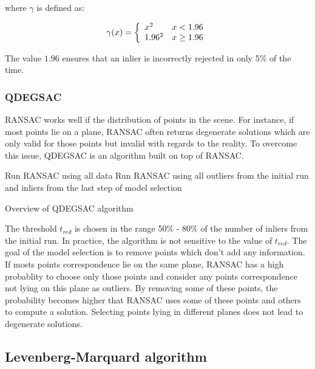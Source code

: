 \documentclass[12pt]{article}
\begin{document}
where $\gamma$ is defined as:

\[
    \gamma(x) = 
\left \{
  \begin{array}{l l}
        x^2 & x < 1.96 \\
        1.96^2 & x \geq 1.96 \\
  \end{array}
\right.
\] 

The value $1.96$ ensures that an inlier is incorrectly rejected in only 5\% of the time.

\subsubsection{QDEGSAC}

RANSAC works well if the distribution of points in the scene. For instance, if most points lie on a plane, RANSAC often returns degenerate solutions which are only valid for those points but invalid with regards to the reality. To overcome this issue, QDEGSAC\cite{Qdegsac06} is an algorithm built on top of RANSAC.

\begin{algorithm}[H]
  Run RANSAC using all data\;
  Run RANSAC using all outliers from the initial run and inliers from the last step of model selection\;
 \caption{Overview of QDEGSAC algorithm}
\end{algorithm}

The threshold $t_{red}$ is chosen in the range 50\% - 80\% of the number of inliers from the initial run. In practice, the algorithm is not sensitive to the value of $t_{red}$. The goal of the model selection is to remove points which don't add any information. If mosts points correspondence lie on the same plane, RANSAC has a high probablity to choose only those points and consider any points correspondence not lying on this plane as outliers. By removing some of these points, the probability becomes higher that RANSAC uses some of these points and others to compute a solution. Selecting points lying in different planes does not lead to degenerate solutions.

\subsection{Levenberg-Marquard algorithm}
\end{document}

